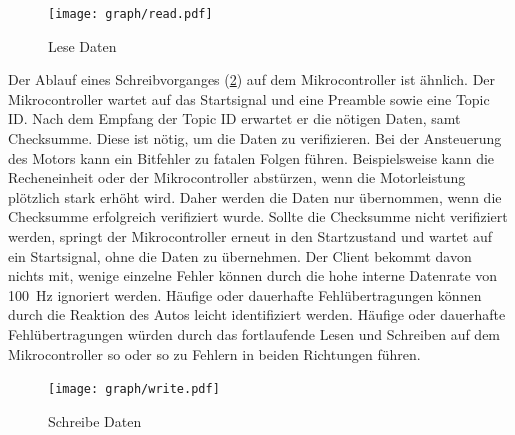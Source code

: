 \begin{figure}[ht]
\centering
\texttt{[image: graph/read.pdf]} 
\caption{Lese Daten}
\label{fig:uC_read}
\end{figure}

Der Ablauf eines Schreibvorganges (\cref{fig:uC_write}) auf dem Mikrocontroller ist ähnlich. Der Mikrocontroller wartet auf das Startsignal und eine Preamble sowie eine Topic ID.
Nach dem Empfang der Topic ID erwartet er die nötigen Daten, samt Checksumme. Diese ist nötig, um die Daten zu verifizieren. Bei der Ansteuerung des Motors kann ein
Bitfehler zu fatalen Folgen führen. Beispielsweise kann die Recheneinheit oder der Mikrocontroller abstürzen, wenn die Motorleistung plötzlich stark erhöht wird.
Daher werden die Daten nur übernommen, wenn die Checksumme erfolgreich verifiziert wurde. Sollte die Checksumme nicht verifiziert werden, springt der Mikrocontroller
erneut in den Startzustand und wartet auf ein Startsignal, ohne die Daten zu übernehmen. Der Client bekommt davon nichts mit, wenige einzelne Fehler können durch die
hohe interne Datenrate von \SI{100}{\Hz} ignoriert werden. Häufige oder dauerhafte Fehlübertragungen können durch die Reaktion des Autos leicht identifiziert werden.
Häufige oder dauerhafte Fehlübertragungen würden durch das fortlaufende Lesen und Schreiben auf dem Mikrocontroller so oder so zu Fehlern in beiden Richtungen führen.

\begin{figure}[ht]
\centering
\texttt{[image: graph/write.pdf]} 
\caption{Schreibe Daten}
\label{fig:uC_write}
\end{figure}





